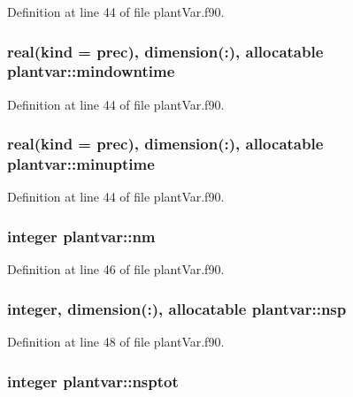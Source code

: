 Definition at line 44 of file plant\-Var.\-f90.

\hypertarget{classplantvar_a9320c1f8ded834439390cb5602c19863}{
\subsubsection[{mindowntime}]{\setlength{\rightskip}{0pt plus 5cm}real(kind = prec), dimension(\-:), allocatable plantvar\-::mindowntime}}\label{classplantvar_a9320c1f8ded834439390cb5602c19863}


Definition at line 44 of file plant\-Var.\-f90.

\hypertarget{classplantvar_aa1e10cfba7b7a224f760c1087d2add6d}{
\subsubsection[{minuptime}]{\setlength{\rightskip}{0pt plus 5cm}real(kind = prec), dimension(\-:), allocatable plantvar\-::minuptime}}\label{classplantvar_aa1e10cfba7b7a224f760c1087d2add6d}


Definition at line 44 of file plant\-Var.\-f90.

\hypertarget{classplantvar_a137041d7f1c30cc7d248b9ada4feab69}{
\subsubsection[{nm}]{\setlength{\rightskip}{0pt plus 5cm}integer plantvar\-::nm}}\label{classplantvar_a137041d7f1c30cc7d248b9ada4feab69}


Definition at line 46 of file plant\-Var.\-f90.

\hypertarget{classplantvar_a16e98f1a836d4de3e5436365e77441b0}{
\subsubsection[{nsp}]{\setlength{\rightskip}{0pt plus 5cm}integer, dimension(\-:), allocatable plantvar\-::nsp}}\label{classplantvar_a16e98f1a836d4de3e5436365e77441b0}


Definition at line 48 of file plant\-Var.\-f90.

\hypertarget{classplantvar_a1301bcb36aec6c118be8c084932de099}{
\subsubsection[{nsptot}]{\setlength{\rightskip}{0pt plus 5cm}integer plantvar\-::nsptot}}\label{classplantvar_a1301bcb36aec6c118be8c084932de099}


